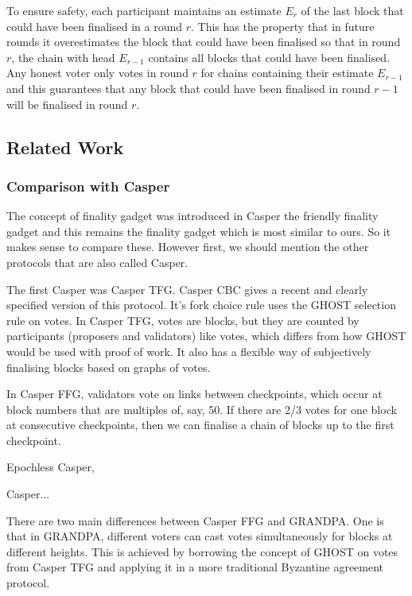 \documentclass{article}
\begin{document}
To ensure safety, each participant maintains an estimate $E_r$ of the last block that could have been finalised in a round $r$. This has the property that in future rounds it overestimates the block that could have been finalised so that in round $r$, the chain with head $E_{r-1}$ contains all blocks that could have been finalised.
Any honest voter only votes in round $r$ for chains containing their estimate $E_{r-1}$ and this guarantees that any block that could have been finalised in round $r-1$ will be finalised in round $r$.

\subsection{Related Work}

\subsubsection{Comparison with Casper}

The concept of finality gadget was introduced in Casper the friendly finality gadget and this remains the finality gadget which is most similar to ours. So it makes sense to compare these. However first, we should mention the other protocols that are also called Casper.

The first Casper was Casper TFG. Casper CBC\cite{CasperCBC} gives a recent and clearly specified version of this protocol. It's fork choice rule uses the GHOST selection rule on votes.
In Casper TFG, votes are blocks, but they are counted by participants (proposers and validators) like votes, which differs from how GHOST would be used with proof of work. It also has a flexible way of subjectively finalising blocks based on graphs of votes. 

In Casper FFG\cite{CasperFFG}, validators vote on links between checkpoints, which occur at block numbers that are multiples of, say, 50. If there are 2/3 votes for one block at consecutive checkpoints, then we can finalise a chain of blocks up to the first checkpoint.

Epochless Casper, 

Casper...

There are two main differences between Casper FFG and GRANDPA. One is that in GRANDPA, different voters can cast votes simultaneously for blocks at different heights. This is achieved by borrowing the concept of GHOST on votes from Casper TFG and applying it in a more traditional Byzantine agreement protocol.
\end{document}
